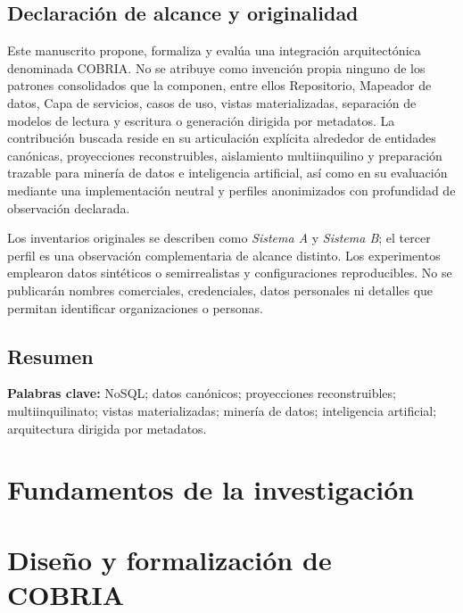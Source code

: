 \documentclass[12pt,oneside]{book}
\newcommand{\COBRIA}{\textsf{COBRIA}}
\begin{document}
\frontmatter
\hypersetup{pageanchor=false}

\hypersetup{pageanchor=true}
\setcounter{page}{1}

\chapter*{Declaración de alcance y originalidad}
Este manuscrito propone, formaliza y evalúa una integración arquitectónica denominada
\COBRIA. No se atribuye como invención propia ninguno de los patrones consolidados que
la componen, entre ellos Repositorio, Mapeador de datos, Capa de servicios, casos de uso, vistas
materializadas, separación de modelos de lectura y escritura o generación dirigida por
metadatos. La contribución buscada reside en su articulación explícita alrededor de
entidades canónicas, proyecciones reconstruibles, aislamiento multiinquilino y preparación
trazable para minería de datos e inteligencia artificial, así como en su evaluación
mediante una implementación neutral y perfiles anonimizados con profundidad de
observación declarada. \COBRIAPerfilesCientificos

Los inventarios originales se describen como \emph{Sistema A} y \emph{Sistema B};
el tercer perfil es una observación complementaria de alcance distinto. Los
experimentos emplearon datos sintéticos o semirrealistas y configuraciones reproducibles.
No se publicarán nombres comerciales, credenciales, datos personales ni detalles que
permitan identificar organizaciones o personas.

\chapter*{Resumen}
\COBRIAResumenCientifico

\noindent\textbf{Palabras clave:} NoSQL; datos canónicos; proyecciones reconstruibles;
multiinquilinato; vistas materializadas; minería de datos; inteligencia artificial;
arquitectura dirigida por metadatos.

\clearpage
\tableofcontents
\clearpage
\listoffigures
\clearpage
\listoftables

\mainmatter
\part{Fundamentos de la investigación}


\part{Diseño y formalización de COBRIA}

\end{document}
